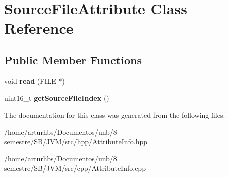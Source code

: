 \hypertarget{classSourceFileAttribute}{}\section{Source\+File\+Attribute Class Reference}
\label{classSourceFileAttribute}
\subsection*{Public Member Functions}
\begin{DoxyCompactItemize}
\item 
void {\bfseries read} (F\+I\+LE $\ast$)\hypertarget{classSourceFileAttribute_a011f9b30a98b40fefa1055dcdff01c12}{}\label{classSourceFileAttribute_a011f9b30a98b40fefa1055dcdff01c12}

\item 
uint16\+\_\+t {\bfseries get\+Source\+File\+Index} ()\hypertarget{classSourceFileAttribute_ab313b007ed8afe72c8f2ac0d6ff4cc0b}{}\label{classSourceFileAttribute_ab313b007ed8afe72c8f2ac0d6ff4cc0b}

\end{DoxyCompactItemize}


The documentation for this class was generated from the following files\+:\begin{DoxyCompactItemize}
\item 
/home/arturhbs/\+Documentos/unb/8 semestre/\+S\+B/\+J\+V\+M/src/hpp/\hyperlink{AttributeInfo_8hpp}{Attribute\+Info.\+hpp}\item 
/home/arturhbs/\+Documentos/unb/8 semestre/\+S\+B/\+J\+V\+M/src/cpp/Attribute\+Info.\+cpp\end{DoxyCompactItemize}

